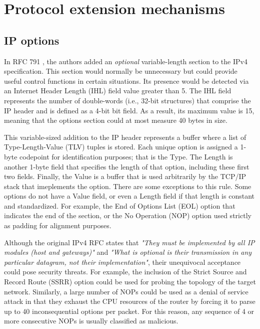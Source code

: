 \section{Protocol extension mechanisms}
\label{background:protocols}

\subsection{IP options}

In RFC 791 \cite{RFC0791}, the authors added an \textit{optional} variable-length
section to the IPv4 specification. This section would normally be unnecessary but
could provide useful control functions in certain situations. Its presence would
be detected via an Internet Header Length (IHL) field value greater than 5. The
IHL field represents the number of double-words (i.e., 32-bit structures) that
comprise the IP header and is defined as a 4-bit bit field. As a result, its
maximum value is 15, meaning that the options section could at most measure 40
bytes in size.

This variable-sized addition to the IP header represents a buffer where a list
of Type-Length-Value (TLV) tuples is stored. Each unique option is assigned a
1-byte codepoint for identification purposes; that is the Type. The Length is
another 1-byte field that specifies the length of that option, including these
first two fields. Finally, the Value is a buffer that is used arbitrarily by
the TCP/IP stack that imeplements the option. There are some exceptions to this
rule. Some options do not have a Value field, or even a Length field if that
length is constant and standardized. For example, the End of Options List (EOL)
option that indicates the end of the section, or the No Operation (NOP) option
used strictly as padding for alignment purposes.

Although the original IPv4 RFC states that \textit{"They must be implemented by
all IP modules (host and gateways)"} and \textit{"What is optional is their
transmission in any particular datagram, not their implementation"}, their
unequivocal acceptance could pose security threats. For example, the inclusion
of the Strict Source and Record Route (SSRR) option could be used for probing
the topology of the target network. Similarly, a large number of NOPs could be
used as a denial of service attack in that they exhaust the CPU resources of the
router by forcing it to parse up to 40 inconsequential options per packet. For
this reason, any sequence of 4 or more consecutive NOPs is usually classified as
malicious.

